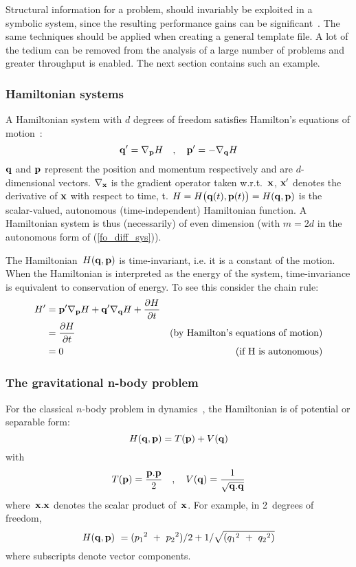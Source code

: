 \documentclass [12pt,twoside]{article}
\begin{document}
Structural information for a problem, should invariably be exploited in a
symbolic system, since the resulting performance gains can be
significant~\cite{brenner}. The same techniques should be applied when creating a
general template file. A lot of the tedium can be removed from the analysis of
a large number of problems and greater throughput is enabled. The next section
contains such an example.

\pagebreak[2]

\subsubsection{Hamiltonian systems}\label{form_ham_sys}

A Hamiltonian system with $d$ degrees of freedom satisfies Hamilton's
equations of motion~\cite{arnold-89}:
$${\bf q}' = \nabla_{\bf p} H \quad,\quad {\bf p}' = - \nabla_{\bf q} H$$
${\bf q}$ and ${\bf p}$ represent the position and momentum
respectively and are $d$-dimensional vectors. $\nabla_{\bf x}$ is the
gradient operator taken w.r.t.~${\bf x}$, ${\bf x}'$ denotes the
derivative of ${\bf x}$ with respect to time, t. $H=H\bigl({\bf q}(t),{\bf
p}(t)\bigr)=H({\bf q},{\bf p})$ is the scalar-valued, autonomous (time-independent)
Hamiltonian function. A Hamiltonian system is thus (necessarily) of even dimension
(with $m=2d$ in the autonomous form of (\ref{fo_diff_sys})).

The Hamiltonian~$H({\bf q},{\bf p})$ is time-invariant, i.e. it is a constant of the motion.
When the Hamiltonian is interpreted as the energy of the system, time-invariance
is equivalent to conservation of energy. To see this consider the chain
rule:
\begin{eqnarray*}
 H' &= {\bf p}' \nabla_{\bf p}H + {\bf q}' \nabla_{\bf q}H + {{\partial
       H}\over {\partial t}} \\
    &= {{\partial H}\over {\partial t}} &\hbox{(by Hamilton's equations
       of motion)} \\
    &= 0 &\hbox{(if H is autonomous)}\\
\end{eqnarray*}

\pagebreak[2]

\subsubsection{The gravitational n-body problem}

For the classical $n$-body problem in dynamics~\cite{arnold-89}, the
Hamiltonian is of potential or separable form:
$$H({\bf q},{\bf p})=T({\bf p}) + V({\bf q})$$
with
$$T({\bf p}) = {{\bf p}.{\bf p}\over 2} \quad , \quad
  V({\bf q}) = {1\over \sqrt{{\bf q}.{\bf q}}}$$
where~${\bf x}.{\bf x}$ denotes the scalar product of~${\bf x}$.
For example, in 2~degrees of freedom,
$$H({\bf q},{\bf p})~= ({p_1}^2~+~{p_2}^2)/2 +
1/{\sqrt{({q_1}^2~+~{q_2}^2)}}$$
where subscripts denote vector components.
\end{document}
